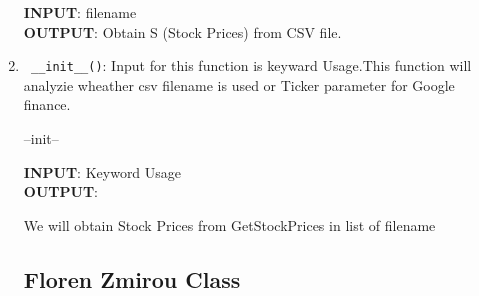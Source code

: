 \begin{enumerate}
\begin{algorithm}
  \bigskip
  \textbf{INPUT}: filename\\
  \textbf{OUTPUT}: Obtain S (Stock Prices) from CSV file.
  \end{algorithm}
  \item \verb! __init__()!: Input for this function is keyward Usage.This function will analyzie wheather csv filename is used or Ticker parameter 
  for Google finance.
  \begin{algorithm}
  \caption{--init--}
  \bigskip
  \textbf{INPUT}: Keyword Usage \\
  \textbf{OUTPUT}:
  \begin{algorithmic}[1]
  \State We  will obtain Stock Prices from GetStockPrices in list of filename
  \end{algorithmic}
  \end{algorithm}
\subsection{Floren Zmirou Class}

\end{enumerate}
